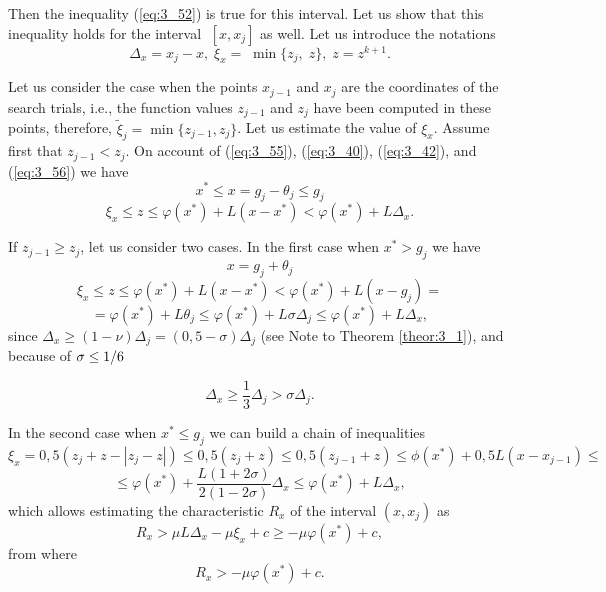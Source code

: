 	Then the inequality  (\ref{eq:3_52}) is true for this interval. Let us show that this inequality holds for the interval \textit{$\; [x,x_{j} ]$} as well. Let us introduce the notations
	\begin{equation}
	\label{eq:3_56}
	\Delta _{x} =x_{j} -x,\; \xi _{x} =\; \min \{ z_{j} ,\; z\} ,\; z=z^{k+1} .
	\end{equation}
	
	Let us consider the case when the points $x_{j-1} $ and $x_j $ are the coordinates of the search trials, i.e., the function values $z_{j-1} $ and $z_j $ have been computed in these points, therefore, $\tilde{\xi }_{j} =\min \{ z_{j-1} ,z_j \} $. Let us estimate the value of $\xi _x $. Assume first that $z_{j-1} <z_j $. On account of  (\ref{eq:3_55}),  (\ref{eq:3_40}),  (\ref{eq:3_42}), and  (\ref{eq:3_56}) we have 	
	\begin{equation*}
	x^{*} \le x=g_j -\theta _j \le g_j 
	\end{equation*}
	\begin{equation*}
	\xi _x \le z\le \varphi (x^{*} )+L(x-x^{*} )<\varphi (x^{*} )+L\Delta _x.
	\end{equation*}
	
	If $z_{j-1} \ge z_j $, let us consider two cases. In the first case when $x^{*} >g_{j} $ we have 
	\begin{equation*}
	x=g_j +\theta _j 
	\end{equation*}
	\begin{equation*}\xi _x \le z\le \varphi (x^{*} )+L(x-x^{*} )<\varphi (x^{*} )+L(x-g_j )=
	\end{equation*}
	\begin{equation*}
	=\varphi (x^{*} )+L\theta _{j} \le \varphi (x^{*} )+L\sigma \Delta _{j} \le \varphi (x^{*} )+L\Delta _{x} ,
	\end{equation*}	
	since $\Delta _x \ge (1-\nu )\Delta _j =(0,5-\sigma )\Delta _j $ (see Note to Theorem \ref{theor:3_1}), and because of $\sigma \le {1/{\vphantom{1 6}}6} $ 
	
	\begin{equation*}
	\Delta _{x} \ge \frac{1}{3} \Delta _{j} >\sigma \Delta _{j}.
	\end{equation*}
	
	In the second case when $x^{*} \le g_j $ we can build a chain of inequalities
	\begin{equation*}
	\xi _{x} =0,5(z_{j} +z-\left|z_{j} -z\right|)\le 0,5(z_{j} +z)\le 0,5(z_{j-1} +z)\le \phi (x^{*} )+0,5L(x-x_{j-1} )\le 
	\end{equation*}
	\begin{equation*}
	\le \varphi (x^{*} )+\frac{L(1+2\sigma )}{2(1-2\sigma )} \Delta _{x} \le \varphi (x^{*} )+L\Delta _{x},
	\end{equation*}
	which allows estimating the characteristic \textit{$R_{x} $} of the interval $(x,x_{j} )$ as
	\begin{equation*}
	R_{x} >\mu L\Delta _{x} -\mu \xi _{x} +c\ge -\mu \varphi (x^{*} )+c,
	\end{equation*}
	from where 
	\begin{equation}
	\label{eq:3_57}
	R_{x} >-\mu \varphi (x^{*} )+c.
	\end{equation}
	
